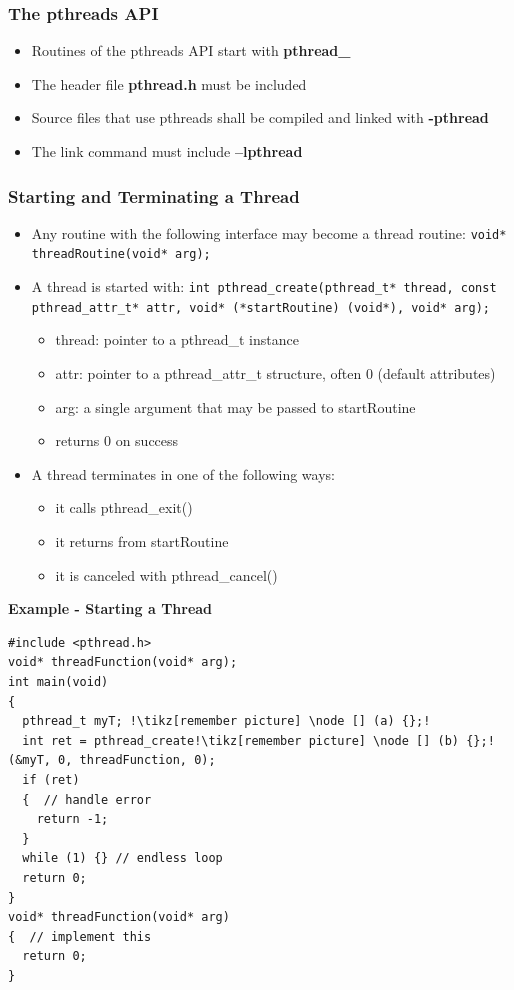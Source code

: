 \subsubsection{The pthreads API}
\begin{itemize}
  \item Routines of the pthreads API start with \textbf{pthread\_}
  \item The header file \textbf{pthread.h} must be included
  \item Source files that use pthreads shall be compiled and linked with \textbf{-pthread}
  \item The link command must include \textbf{–lpthread}
\end{itemize}

\subsubsection{Starting and Terminating a Thread}
\begin{itemize}
  \item Any routine with the following interface may become a thread routine: \lstinline{void* threadRoutine(void* arg);}
  \item A thread is started with:\newline
  \lstinline{int pthread_create(pthread_t* thread, const pthread_attr_t* attr, void* (*startRoutine) (void*), void* arg);}
  \begin{itemize}
  \item thread: pointer to a pthread\_t instance
  \item attr: pointer to a pthread\_attr\_t structure, often 0 (default attributes)
  \item arg: a single argument that may be passed to startRoutine
  \item returns 0 on success
  \end{itemize}
\item A thread terminates in one of the following ways:
  \begin{itemize}
  \item it calls pthread\_exit()
  \item it returns from startRoutine
  \item it is canceled with pthread\_cancel()
  \end{itemize}
\end{itemize}
\textbf{Example - Starting a Thread}
\begin{lstlisting}[style=C, escapechar=!]
#include <pthread.h>
void* threadFunction(void* arg);
int main(void)
{
  pthread_t myT; !\tikz[remember picture] \node [] (a) {};!
  int ret = pthread_create!\tikz[remember picture] \node [] (b) {};!(&myT, 0, threadFunction, 0);
  if (ret)
  {  // handle error
    return -1;
  }
  while (1) {} // endless loop
  return 0;
}
void* threadFunction(void* arg)
{  // implement this
  return 0;
}
\end{lstlisting}
